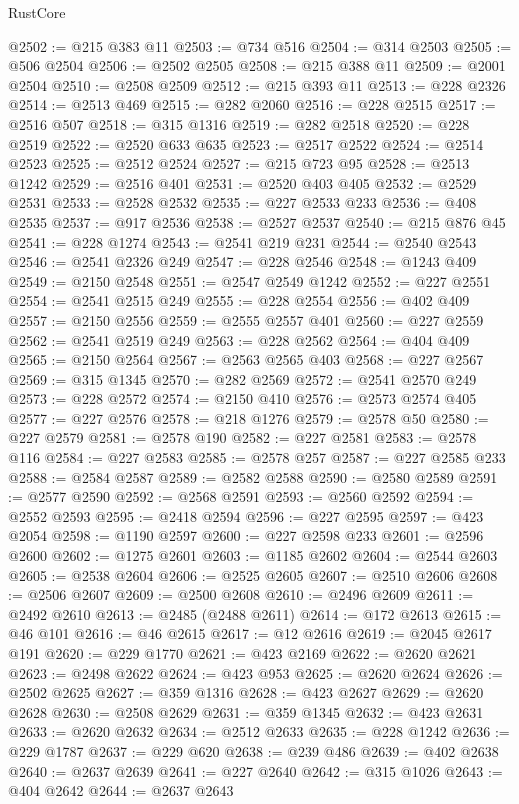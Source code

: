 \begin{lexlean}{RustCore}
\begin{coremodule}
@2502 := @215 @383 @11
@2503 := @734 @516
@2504 := @314 @2503
@2505 := @506 @2504
@2506 := @2502 @2505
@2508 := @215 @388 @11
@2509 := @2001 @2504
@2510 := @2508 @2509
@2512 := @215 @393 @11
@2513 := @228 @2326
@2514 := @2513 @469
@2515 := @282 @2060
@2516 := @228 @2515
@2517 := @2516 @507
@2518 := @315 @1316
@2519 := @282 @2518
@2520 := @228 @2519
@2522 := @2520 @633 @635
@2523 := @2517 @2522
@2524 := @2514 @2523
@2525 := @2512 @2524
@2527 := @215 @723 @95
@2528 := @2513 @1242
@2529 := @2516 @401
@2531 := @2520 @403 @405
@2532 := @2529 @2531
@2533 := @2528 @2532
@2535 := @227 @2533 @233
@2536 := @408 @2535
@2537 := @917 @2536
@2538 := @2527 @2537
@2540 := @215 @876 @45
@2541 := @228 @1274
@2543 := @2541 @219 @231
@2544 := @2540 @2543
@2546 := @2541 @2326 @249
@2547 := @228 @2546
@2548 := @1243 @409
@2549 := @2150 @2548
@2551 := @2547 @2549 @1242
@2552 := @227 @2551
@2554 := @2541 @2515 @249
@2555 := @228 @2554
@2556 := @402 @409
@2557 := @2150 @2556
@2559 := @2555 @2557 @401
@2560 := @227 @2559
@2562 := @2541 @2519 @249
@2563 := @228 @2562
@2564 := @404 @409
@2565 := @2150 @2564
@2567 := @2563 @2565 @403
@2568 := @227 @2567
@2569 := @315 @1345
@2570 := @282 @2569
@2572 := @2541 @2570 @249
@2573 := @228 @2572
@2574 := @2150 @410
@2576 := @2573 @2574 @405
@2577 := @227 @2576
@2578 := @218 @1276
@2579 := @2578 @50
@2580 := @227 @2579
@2581 := @2578 @190
@2582 := @227 @2581
@2583 := @2578 @116
@2584 := @227 @2583
@2585 := @2578 @257
@2587 := @227 @2585 @233
@2588 := @2584 @2587
@2589 := @2582 @2588
@2590 := @2580 @2589
@2591 := @2577 @2590
@2592 := @2568 @2591
@2593 := @2560 @2592
@2594 := @2552 @2593
@2595 := @2418 @2594
@2596 := @227 @2595
@2597 := @423 @2054
@2598 := @1190 @2597
@2600 := @227 @2598 @233
@2601 := @2596 @2600
@2602 := @1275 @2601
@2603 := @1185 @2602
@2604 := @2544 @2603
@2605 := @2538 @2604
@2606 := @2525 @2605
@2607 := @2510 @2606
@2608 := @2506 @2607
@2609 := @2500 @2608
@2610 := @2496 @2609
@2611 := @2492 @2610
@2613 := @2485 (@2488 @2611)
@2614 := @172 @2613
@2615 := @46 @101
@2616 := @46 @2615
@2617 := @12 @2616
@2619 := @2045 @2617 @191
@2620 := @229 @1770
@2621 := @423 @2169
@2622 := @2620 @2621
@2623 := @2498 @2622
@2624 := @423 @953
@2625 := @2620 @2624
@2626 := @2502 @2625
@2627 := @359 @1316
@2628 := @423 @2627
@2629 := @2620 @2628
@2630 := @2508 @2629
@2631 := @359 @1345
@2632 := @423 @2631
@2633 := @2620 @2632
@2634 := @2512 @2633
@2635 := @228 @1242
@2636 := @229 @1787
@2637 := @229 @620
@2638 := @239 @486
@2639 := @402 @2638
@2640 := @2637 @2639
@2641 := @227 @2640
@2642 := @315 @1026
@2643 := @404 @2642
@2644 := @2637 @2643

\end{coremodule}
\end{lexlean}
